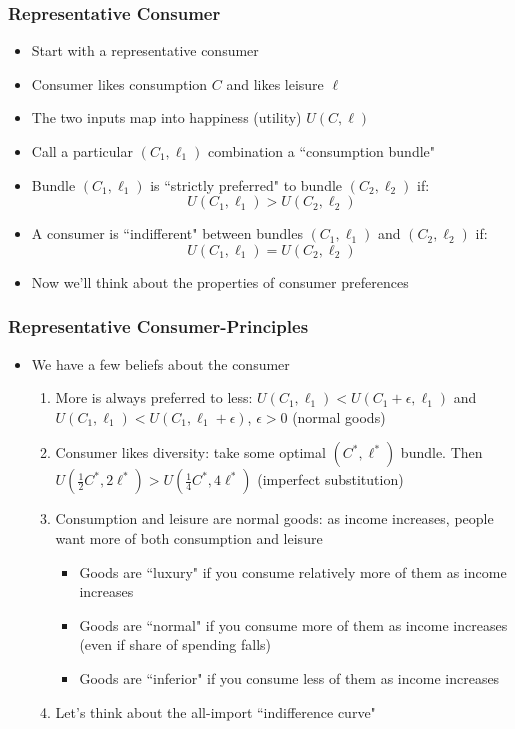 \documentclass{beamer}
\begin{document}
\begin{frame}
\frametitle[alignment=center]{Representative Consumer}
\begin{itemize}
\item Start with a representative consumer
\bigskip
\item Consumer likes consumption $C$ and likes leisure $\ell$
\bigskip
\item The two inputs map into happiness (utility) $U(C,\ell)$
\bigskip
\item  Call a particular $(C_1,\ell_1)$ combination a ``consumption bundle"
\bigskip
\item Bundle $(C_1,\ell_1)$ is ``strictly preferred" to bundle $(C_2,\ell_2)$ if:
$$U(C_1,\ell_1)>U(C_2,\ell_2)$$
\item A consumer is ``indifferent" between bundles  $(C_1,\ell_1)$ and $(C_2,\ell_2)$ if:
$$U(C_1,\ell_1)=U(C_2,\ell_2)$$
\item Now we'll think about the properties of consumer preferences
\end{itemize}
\end{frame}

\begin{frame}
\frametitle[alignment=center]{Representative Consumer-Principles}
\begin{itemize}
\item We have a few beliefs about the consumer
\begin{enumerate}
\item More is always preferred to less: $U(C_1,\ell_1)<U(C_1+\epsilon,\ell_1)$ and $U(C_1,\ell_1)<U(C_1,\ell_1+\epsilon)$, $\epsilon>0$ (normal goods)
\bigskip
\item Consumer likes diversity: take some optimal $(C^*,\ell^*)$ bundle.  Then $U(\frac{1}{2}C^*,2\ell^*)>U(\frac{1}{4}C^*,4\ell^*)$  (imperfect substitution)
\bigskip
\item Consumption and leisure are normal goods: as income increases, people want more of both consumption and leisure
\begin{itemize}
\item Goods are ``luxury" if you consume relatively more of them as income increases
\item Goods are ``normal" if you consume more of them as income increases (even if share of spending falls)
\item Goods are ``inferior" if you consume less of them as income increases
\end{itemize}
\item Let's think about the all-import ``indifference curve"
\end{enumerate}
\end{itemize}
\end{frame}
\end{document}
